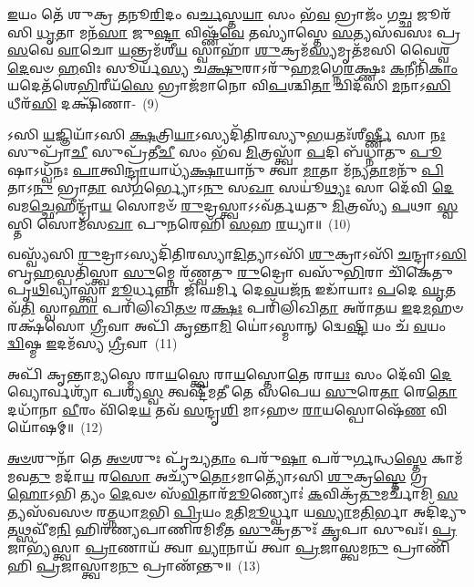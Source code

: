 {\anuvakamend[{𑌆 𑌤𑍍𑌵𑍞 𑌹𑌯𑍋᳴\-𑌽\-\ul{𑌸𑌿} 𑌮\-\ul{𑌮} 𑌭𑍋𑌗𑌾᳴𑌯 𑌭𑌵 \ul{𑌸𑍍𑌯} 𑌪𑌞𑍍𑌚᳴𑌵𑌿𑍞𑌶𑌤𑌿𑌶𑍍𑌚}]}%

\-\ul{𑌇}\-𑌯𑌂 𑌤𑍇᳴ 𑌶𑍁𑌕𑍍𑌰 \ul{𑌤}\-𑌨𑍂\-\ul{𑌰𑌿}\-𑌦𑌂 𑌵\-\ul{𑌰𑍍𑌚}\-𑌸𑍍𑌤\-\ul{𑌯𑌾} 𑌸𑌂 𑌭᳴\-\ul{𑌵} 𑌭𑍍𑌰𑌾𑌜𑌂᳴ 𑌗\-\ul{𑌚𑍍𑌛} 𑌜𑍂𑌰᳴𑌸𑌿 \ul{𑌧𑍃}\-𑌤𑌾 𑌮𑌨᳴\-\ul{𑌸𑌾} 𑌜𑍁\-\ul{𑌷𑍍𑌟𑌾} 𑌵𑌿𑌷𑍍𑌣᳴\-\ul{𑌵𑍇} 𑌤𑌸𑍍𑌯𑌾॑𑌸𑍍𑌤𑍇 \ul{𑌸}\-𑌤𑍍𑌯𑌸᳴𑌵𑌸𑌃 𑌪𑍍𑌰\-\ul{𑌸}\-𑌵𑍇 \ul{𑌵𑌾}\-𑌚𑍋 \ul{𑌯}\-𑌨𑍍𑌤𑍍𑌰𑌮᳴𑌶𑍀\-\ul{𑌯} 𑌸𑍍𑌵𑌾𑌹𑌾᳴ \ul{𑌶𑍁}\-𑌕𑍍𑌰𑌮᳴\-\ul{𑌸𑍍𑌯}\-𑌮𑍃𑌤᳴𑌮𑌸𑌿 𑌵𑍈𑌶𑍍𑌵\-\ul{𑌦𑍇}\-𑌵𑍞 \ul{𑌹}\-𑌵𑌿𑌃 𑌸𑍂𑌰𑍍𑌯᳴\-\ul{𑌸𑍍𑌯} 𑌚\-\ul{𑌕𑍍𑌷𑍁}\-𑌰𑌾\-𑌽𑌰𑍁᳴𑌹\-\ul{𑌮}\-𑌗𑍍𑌨𑍇\-\ul{𑌰}\-𑌕𑍍𑌷𑍍𑌣𑌃 \ul{𑌕}\-𑌨𑍀𑌨𑌿᳴\-\ul{𑌕𑌾𑌂} 𑌯𑌦𑍇𑌤᳴𑌶𑍇\-\ul{𑌭𑌿}\-𑌰𑍀𑌯᳴\-\ul{𑌸𑍇} 𑌭𑍍𑌰𑌾𑌜᳴𑌮𑌾𑌨𑍋 𑌵𑌿\-\ul{𑌪}\-𑌶𑍍𑌚𑌿\-\ul{𑌤𑌾} 𑌚𑌿𑌦᳴𑌸𑌿 \ul{𑌮}\-𑌨𑌾\-𑌽\-\ul{𑌸𑌿} 𑌧𑍀𑌰᳴\-\ul{𑌸𑌿} 𑌦𑌕𑍍𑌷𑌿᳴𑌣𑌾-~(9)

𑌽𑌸𑌿 \ul{𑌯}\-𑌜𑍍𑌞𑌿𑌯𑌾᳴\-𑌽𑌸𑌿 \ul{𑌕𑍍𑌷}\-𑌤𑍍𑌰𑌿\-\ul{𑌯𑌾}\-\-𑌽𑌸𑍍𑌯𑌦𑌿᳴𑌤𑌿𑌰𑌸𑍍𑌯𑍁\-\ul{𑌭}\-𑌯𑌤𑌃᳴𑌶𑍀\-\ul{𑌰𑍍𑌷𑍍𑌣𑍀} 𑌸𑌾 \ul{𑌨𑌃} 𑌸𑍁𑌪𑍍𑌰𑌾᳴\-\ul{𑌚𑍀} 𑌸𑍁𑌪𑍍𑌰᳴𑌤𑍀\-\ul{𑌚𑍀} 𑌸𑌂 𑌭᳴𑌵 \ul{𑌮𑌿}\-𑌤𑍍𑌰𑌸𑍍𑌤𑍍𑌵𑌾᳴ \ul{𑌪}\-𑌦𑌿 𑌬᳴𑌧𑍍𑌨𑌾𑌤𑍁 \ul{𑌪𑍂}\-𑌷𑌾\-𑌽𑌧𑍍𑌵᳴𑌨𑌃 \ul{𑌪𑌾}\-𑌤𑍍𑌵𑌿\-\ul{𑌨𑍍𑌦𑍍𑌰𑌾}\-𑌯𑌾𑌧𑍍𑌯᳴\-\ul{𑌕𑍍𑌷𑌾}\-𑌯𑌾𑌨𑍁᳴ 𑌤𑍍𑌵𑌾 \ul{𑌮𑌾}\-𑌤𑌾 𑌮᳴𑌨𑍍𑌯\-\ul{𑌤𑌾}\-𑌮𑌨𑍁᳴ \ul{𑌪𑌿}\-𑌤𑌾\-𑌽\-\ul{𑌨𑍁} 𑌭𑍍𑌰𑌾\-\ul{𑌤𑌾} 𑌸\-\ul{𑌗}\-𑌰𑍍𑌭𑍍𑌯𑍋\-𑌽\-\ul{𑌨𑍁} 𑌸\-\ul{𑌖𑌾} 𑌸𑌯𑍂॑\-\ul{𑌥𑍍𑌯𑌃} 𑌸𑌾 𑌦𑍇᳴𑌵𑌿 \ul{𑌦𑍇}\-𑌵𑌮\-\ul{𑌚𑍍𑌛𑍇}\-𑌹𑍀𑌨𑍍𑌦𑍍𑌰𑌾᳴\-\ul{𑌯} 𑌸𑍋𑌮𑍞᳴ \ul{𑌰𑍁}\-𑌦𑍍𑌰𑌸𑍍𑌤𑍍𑌵𑌾\-𑌽\-𑌽𑌵᳴𑌰𑍍𑌤𑌯𑌤𑍁 \ul{𑌮𑌿}\-𑌤𑍍𑌰𑌸𑍍𑌯᳴ \ul{𑌪}\-𑌥𑌾 \ul{𑌸𑍍𑌵}\-𑌸𑍍𑌤𑌿 𑌸𑍋𑌮᳴𑌸\-\ul{𑌖𑌾} 𑌪𑍁\-\ul{𑌨}\-𑌰𑍇𑌹𑌿᳴ \ul{𑌸}\-𑌹 \ul{𑌰}\-𑌯𑍍𑌯𑌾॥~(10)

{\anuvakamend[{𑌦𑌕𑍍𑌷𑌿᳴\-\ul{𑌣𑌾} 𑌸𑍋𑌮᳴𑌸\-\ul{𑌖𑌾} 𑌪𑌞𑍍𑌚᳴ 𑌚}]}%

𑌵𑌸𑍍𑌵𑍍𑌯᳴𑌸𑌿 \ul{𑌰𑍁}\-𑌦𑍍𑌰𑌾\-𑌽𑌸𑍍𑌯𑌦𑌿᳴𑌤𑌿𑌰𑌸𑍍𑌯𑌾\-\ul{𑌦𑌿}\-𑌤𑍍𑌯𑌾\-𑌽𑌸𑌿᳴ \ul{𑌶𑍁}\-𑌕𑍍𑌰𑌾\-𑌽𑌸𑌿᳴ \ul{𑌚}\-𑌨𑍍𑌦𑍍𑌰𑌾\-𑌽\-\ul{𑌸𑌿} 𑌬𑍃\-\ul{𑌹}\-𑌸𑍍𑌪𑌤𑌿᳴𑌸𑍍𑌤𑍍𑌵𑌾 \ul{𑌸𑍁}\-𑌮𑍍𑌨𑍇 𑌰᳴𑌣𑍍𑌵𑌤𑍁 \ul{𑌰𑍁}\-𑌦𑍍𑌰𑍋 𑌵𑌸𑍁᳴\-\ul{𑌭𑌿}\-𑌰𑌾 𑌚𑌿᳴𑌕𑍇𑌤𑍁 𑌪𑍃\-\ul{𑌥𑌿}\-𑌵𑍍𑌯𑌾𑌸𑍍𑌤𑍍𑌵𑌾᳴ \ul{𑌮𑍂}\-𑌰𑍍𑌧𑌨𑍍𑌨𑌾 𑌜𑌿᳴𑌘𑌰𑍍𑌮𑌿 𑌦𑍇\-\ul{𑌵}\-𑌯𑌜᳴\-\ul{𑌨} 𑌇𑌡𑌾᳴𑌯𑌾𑌃 \ul{𑌪}\-𑌦𑍇 \ul{𑌘𑍃}\-𑌤𑌵᳴\-\ul{𑌤𑌿} 𑌸𑍍𑌵𑌾\-\ul{𑌹𑌾} 𑌪𑌰𑌿᳴𑌲𑌿𑌖𑌿\-\ul{𑌤}\-\-\ul{𑍞} 𑌰\-\ul{𑌕𑍍𑌷𑌃} 𑌪𑌰𑌿᳴𑌲𑌿𑌖𑌿\-\ul{𑌤𑌾} 𑌅𑌰𑌾᳴𑌤𑌯 \ul{𑌇}\-𑌦\-\ul{𑌮}\-𑌹𑍞 𑌰𑌕𑍍𑌷᳴𑌸𑍋 \ul{𑌗𑍍𑌰𑍀}\-𑌵𑌾 𑌅𑌪𑌿᳴ 𑌕𑍃𑌨𑍍𑌤𑌾\-\ul{𑌮𑌿} 𑌯𑍋॑\-𑌽𑌸𑍍𑌮𑌾𑌨𑍍 𑌦𑍍𑌵𑍇\-\ul{𑌷𑍍𑌟𑌿} 𑌯𑌂 𑌚᳴ \ul{𑌵}\-𑌯𑌂 \ul{𑌦𑍍𑌵𑌿}\-𑌷𑍍𑌮 \ul{𑌇}\-𑌦𑌮᳴𑌸𑍍𑌯 \ul{𑌗𑍍𑌰𑍀}\-𑌵𑌾~(11)

𑌅𑌪𑌿᳴ 𑌕𑍃𑌨𑍍𑌤𑌾\-\ul{𑌮𑍍𑌯}\-𑌸𑍍𑌮𑍇 𑌰𑌾\-\ul{𑌯}\-𑌸𑍍𑌤𑍍𑌵𑍇 𑌰𑌾\-\ul{𑌯}\-𑌸𑍍𑌤𑍋\-\ul{𑌤𑍇} 𑌰𑌾\-\ul{𑌯𑌃} 𑌸𑌂 𑌦𑍇᳴𑌵𑌿 \ul{𑌦𑍇}\-𑌵𑍍𑌯𑍋𑌰𑍍𑌵𑌶𑍍𑌯𑌾᳴ 𑌪𑌶𑍍𑌯\-\ul{𑌸𑍍𑌵} 𑌤𑍍𑌵𑌷𑍍𑌟𑍀᳴𑌮𑌤𑍀 𑌤𑍇 𑌸𑌪𑍇𑌯 \ul{𑌸𑍁}\-𑌰𑍇\-\ul{𑌤𑌾} 𑌰𑍇\-\ul{𑌤𑍋} 𑌦𑌧𑌾᳴𑌨𑌾 \ul{𑌵𑍀}\-𑌰𑌂 𑌵𑌿᳴𑌦𑍇\-\ul{𑌯} 𑌤𑌵᳴ \ul{𑌸}\-𑌨𑍍𑌦𑍃\-\ul{𑌶𑌿} 𑌮𑌾\-𑌽𑌹𑍞 \ul{𑌰𑌾}\-𑌯𑌸𑍍𑌪𑍋𑌷𑍇᳴\-\ul{𑌣} 𑌵𑌿 𑌯𑍋᳴𑌷𑌮𑍍॥~(12)

{\anuvakamend[{\-\ul{𑌅}\-\-\ul{𑌸𑍍𑌯} \ul{𑌗𑍍𑌰𑍀}\-𑌵𑌾 𑌏\-\ul{𑌕𑌾}\-𑌨𑍍𑌨\-\ul{𑌤𑍍𑌰𑌿}\-\-\ul{𑍞}\-𑌶𑌚𑍍𑌚᳴}]}%

\-\ul{𑌅}\-\-\ul{𑍞}\-𑌶𑍁𑌨𑌾᳴ 𑌤𑍇 \ul{𑌅}\-\-\ul{𑍞}\-𑌶𑍁𑌃 𑌪𑍃᳴𑌚𑍍𑌯\-\ul{𑌤𑌾𑌂} 𑌪𑌰𑍁᳴\-\ul{𑌷𑌾} 𑌪𑌰𑍁᳴\-\ul{𑌰𑍍𑌗}\-𑌨𑍍𑌧\-\ul{𑌸𑍍𑌤𑍇} 𑌕𑌾𑌮᳴𑌮𑌵\-\ul{𑌤𑍁} 𑌮𑌦𑌾᳴\-\ul{𑌯} 𑌰\-\ul{𑌸𑍋} 𑌅𑌚𑍍𑌯𑍁᳴\-\ul{𑌤𑍋}\-\-𑌽𑌮𑌾𑌤𑍍𑌯𑍋᳴\-𑌽𑌸𑌿 \ul{𑌶𑍁}\-𑌕𑍍𑌰\-\ul{𑌸𑍍𑌤𑍇} 𑌗𑍍𑌰\-\ul{𑌹𑍋}\-\-𑌽𑌭𑌿 𑌤𑍍𑌯𑌂 \ul{𑌦𑍇}\-𑌵𑍞 𑌸᳴\-\ul{𑌵𑌿}\-𑌤𑌾𑌰᳴\-\ul{𑌮𑍂}\-𑌣𑍍𑌯𑍋𑌃॑ \ul{𑌕}\-𑌵𑌿𑌕𑍍𑌰᳴\-\ul{𑌤𑍁}\-𑌮𑌰𑍍𑌚𑌾᳴𑌮𑌿 \ul{𑌸}\-𑌤𑍍𑌯𑌸᳴𑌵𑌸𑍞 𑌰\-\ul{𑌤𑍍𑌨}\-𑌧𑌾\-\ul{𑌮}\-𑌭𑌿 \ul{𑌪𑍍𑌰𑌿}\-𑌯𑌂 \ul{𑌮}\-𑌤𑌿\-\ul{𑌮𑍂}\-𑌰𑍍𑌧𑍍𑌵𑌾 𑌯\-\ul{𑌸𑍍𑌯𑌾}\-𑌮\-\ul{𑌤𑌿}\-𑌰𑍍𑌭𑌾 𑌅𑌦𑌿᳴𑌦𑍍𑌯𑍁\-\ul{𑌤}\-𑌥𑍍𑌸𑌵𑍀᳴𑌮\-\ul{𑌨𑌿} 𑌹𑌿𑌰᳴𑌣𑍍𑌯𑌪𑌾𑌣𑌿𑌰𑌮𑌿𑌮𑍀𑌤 \ul{𑌸𑍁}\-𑌕𑍍𑌰𑌤𑍁𑌃᳴ \ul{𑌕𑍃}\-𑌪𑌾 𑌸𑍁𑌵𑌃᳴। \ul{𑌪𑍍𑌰}\-𑌜𑌾𑌭𑍍𑌯᳴𑌸𑍍𑌤𑍍𑌵𑌾 \ul{𑌪𑍍𑌰𑌾}\-𑌣𑌾𑌯᳴ 𑌤𑍍𑌵𑌾 \ul{𑌵𑍍𑌯𑌾}\-𑌨𑌾𑌯᳴ 𑌤𑍍𑌵𑌾 \ul{𑌪𑍍𑌰}\-𑌜𑌾𑌸𑍍𑌤𑍍𑌵𑌮\-\ul{𑌨𑍁} 𑌪𑍍𑌰𑌾𑌣𑌿᳴𑌹𑌿 \ul{𑌪𑍍𑌰}\-𑌜𑌾𑌸𑍍𑌤𑍍𑌵𑌾𑌮\-\ul{𑌨𑍁} 𑌪𑍍𑌰𑌾𑌣᳴𑌨𑍍𑌤𑍁॥~(13)

